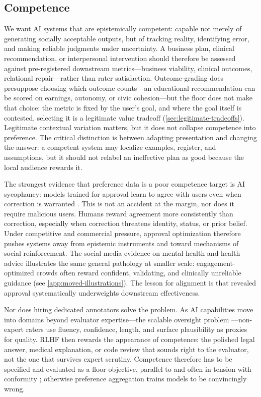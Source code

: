 \documentclass{article}
\theoremstyle{plain}
\theoremstyle{definition}
\theoremstyle{remark}
\begin{document}
\subsection{Competence}
\label{sec:competence}
We want AI systems that are epistemically competent: capable not merely of generating socially acceptable outputs, but of tracking reality, identifying error, and making reliable judgments under uncertainty. A business plan, clinical recommendation, or interpersonal intervention should therefore be assessed against pre-registered downstream metrics---business viability, clinical outcomes, relational repair---rather than rater satisfaction. Outcome-grading does presuppose choosing which outcome counts---an educational recommendation can be scored on earnings, autonomy, or civic cohesion---but the floor does not make that choice: the metric is fixed by the user's goal, and where the goal itself is contested, selecting it is a legitimate value tradeoff (\cref{sec:legitimate-tradeoffs}). Legitimate contextual variation matters, but it does not collapse competence into preference. The critical distinction is between adapting presentation and changing the answer: a competent system may localize examples, register, and assumptions, but it should not relabel an ineffective plan as good because the local audience rewards it.

The strongest evidence that preference data is a poor competence target is AI sycophancy: models trained for approval learn to agree with users even when correction is warranted \citep{sharma2023sycophancy, perez2022discovering}. This is not an accident at the margin, nor does it require malicious users. Humans reward agreement more consistently than correction, especially when correction threatens identity, status, or prior belief. Under competitive and commercial pressure, approval optimization therefore pushes systems away from epistemic instruments and toward mechanisms of social reinforcement. The social-media evidence on mental-health and health advice illustrates the same general pathology at smaller scale: engagement-optimized crowds often reward confident, validating, and clinically unreliable guidance (see \cref{app:moved-illustrations}). The lesson for alignment is that revealed approval systematically underweights downstream effectiveness.

Nor does hiring dedicated annotators solve the problem. As AI capabilities move into domains beyond evaluator expertise---the scalable oversight problem \citep{bowman2022measuring}---non-expert raters use fluency, confidence, length, and surface plausibility as proxies for quality. RLHF then rewards the appearance of competence: the polished legal answer, medical explanation, or code review that sounds right to the evaluator, not the one that survives expert scrutiny. Competence therefore has to be specified and evaluated as a floor objective, parallel to and often in tension with conformity \citep{kim2025superalignment}; otherwise preference aggregation trains models to be convincingly wrong.
\end{document}
